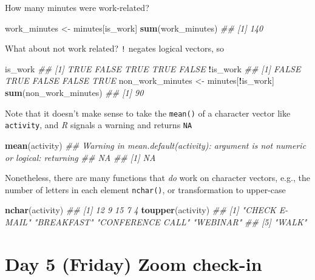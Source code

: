 \documentclass[
]{book}
\newenvironment{Shaded}{\begin{snugshade}}{\end{snugshade}}
\newcommand{\CommentTok}[1]{\textcolor[rgb]{0.56,0.35,0.01}{\textit{#1}}}
\newcommand{\KeywordTok}[1]{\textcolor[rgb]{0.13,0.29,0.53}{\textbf{#1}}}
\newcommand{\NormalTok}[1]{#1}
\newcommand{\OperatorTok}[1]{\textcolor[rgb]{0.81,0.36,0.00}{\textbf{#1}}}
\newcommand{\StringTok}[1]{\textcolor[rgb]{0.31,0.60,0.02}{#1}}
\begin{document}
How many minutes were work-related?

\begin{Shaded}
\begin{Highlighting}[]
\NormalTok{work_minutes <-}\StringTok{ }\NormalTok{minutes[is_work]}
\KeywordTok{sum}\NormalTok{(work_minutes)}
\CommentTok{## [1] 140}
\end{Highlighting}
\end{Shaded}

What about not work related? \texttt{!} negates logical vectors, so

\begin{Shaded}
\begin{Highlighting}[]
\NormalTok{is_work}
\CommentTok{## [1]  TRUE FALSE  TRUE  TRUE FALSE}
\OperatorTok{!}\NormalTok{is_work}
\CommentTok{## [1] FALSE  TRUE FALSE FALSE  TRUE}
\NormalTok{non_work_minutes <-}\StringTok{ }\NormalTok{minutes[}\OperatorTok{!}\NormalTok{is_work]}
\KeywordTok{sum}\NormalTok{(non_work_minutes)}
\CommentTok{## [1] 90}
\end{Highlighting}
\end{Shaded}

Note that it doesn't make sense to take the \texttt{mean()} of a character vector like \texttt{activity}, and \emph{R} signals a warning and returns \texttt{NA}

\begin{Shaded}
\begin{Highlighting}[]
\KeywordTok{mean}\NormalTok{(activity)}
\CommentTok{## Warning in mean.default(activity): argument is not numeric or logical: returning}
\CommentTok{## NA}
\CommentTok{## [1] NA}
\end{Highlighting}
\end{Shaded}

Nonetheless, there are many functions that \emph{do} work on character vectors, e.g., the number of letters in each element \texttt{nchar()}, or transformation to upper-case

\begin{Shaded}
\begin{Highlighting}[]
\KeywordTok{nchar}\NormalTok{(activity)}
\CommentTok{## [1] 12  9 15  7  4}
\KeywordTok{toupper}\NormalTok{(activity)}
\CommentTok{## [1] "CHECK E-MAIL"    "BREAKFAST"       "CONFERENCE CALL" "WEBINAR"        }
\CommentTok{## [5] "WALK"}
\end{Highlighting}
\end{Shaded}

\hypertarget{day-5-friday-zoom-check-in}{%
\section{Day 5 (Friday) Zoom check-in}\label{day-5-friday-zoom-check-in}}
\end{document}
